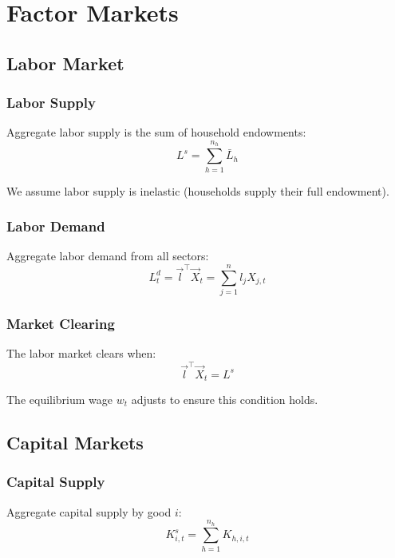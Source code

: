 \documentclass[12pt,a4paper]{article}
\theoremstyle{definition}
\theoremstyle{remark}
\begin{document}
\section{Factor Markets}

\subsection{Labor Market}

\subsubsection{Labor Supply}

Aggregate labor supply is the sum of household endowments:
\begin{equation}
    L^s = \sum_{h=1}^{n_h} \bar{L}_h
\end{equation}

We assume labor supply is inelastic (households supply their full endowment).

\subsubsection{Labor Demand}

Aggregate labor demand from all sectors:
\begin{equation}
    L^d_t = \vec{l}^\top \vec{X}_t = \sum_{j=1}^n l_j X_{j,t}
\end{equation}

\subsubsection{Market Clearing}

The labor market clears when:
\begin{equation}
    \vec{l}^\top \vec{X}_t = L^s
\end{equation}

The equilibrium wage $w_t$ adjusts to ensure this condition holds.

\subsection{Capital Markets}

\subsubsection{Capital Supply}

Aggregate capital supply by good $i$:
\begin{equation}
    K_{i,t}^s = \sum_{h=1}^{n_h} K_{h,i,t}
\end{equation}
\end{document}
